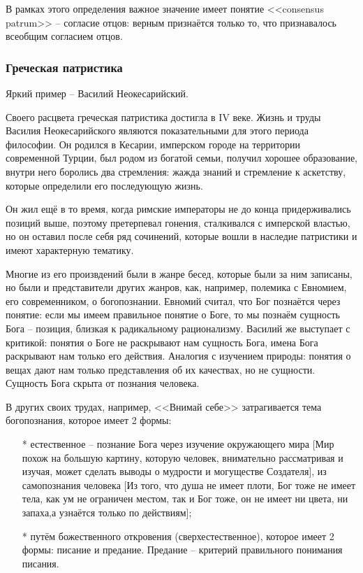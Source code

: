 \documentclass[a4paper, 12pt]{book} %
\begin{document}
В рамках этого определения важное значение имеет понятие <<consensus patrum>> -- согласие отцов: верным признаётся только то, что признавалось всеобщим согласием отцов.

\subsubsection{Греческая патристика}
Яркий пример -- Василий Неокесарийский.

Своего расцвета греческая патристика достигла в IV веке. Жизнь и труды Василия Неокесарийского являются показательными для этого периода философии. Он родился в Кесарии, имперском городе на территории современной Турции, был родом из богатой семьи, получил хорошее образование, внутри него боролись два стремления: жажда знаний и стремление к аскетству, которые определили его последующую жизнь.

Он жил ещё в то время, когда римские императоры не до конца придерживались позиций выше, поэтому претерпевал гонения, сталкивался с имперской властью, но он оставил после себя ряд сочинений, которые вошли в наследие патристики и имеют характерную тематику. 

Многие из его произвдений были в жанре бесед, которые были за ним записаны, но были и представители других жанров, как, например, полемика с Евномием, его современником, о богопознании. Евномий считал, что Бог познаётся через понятие: если мы имеем правильное понятие о Боге, то мы познаём сущность Бога -- позиция, близкая к радикальному рационализму. Василий же выступает с критикой: понятия о Боге не раскрывают нам сущность Бога, имена Бога раскрывают нам только его действия. Аналогия с изучением природы: понятия о вещах дают нам только представления об их качествах, но не сущности. Сущность Бога скрыта от познания человека. 

В других своих трудах, например, <<Внимай себе>> затрагивается тема богопознания, которое имеет 2 формы:
\begin{itemize}
\item[*] естественное -- познание Бога через изучение окружающего мира [Мир похож на большую картину, которую человек, внимательно рассматривая и изучая, может сделать выводы о мудрости и могуществе Создателя], из самопознания человека [Из того, что душа не имеет плоти, Бог тоже не имеет тела, как ум не ограничен местом, так и Бог тоже, он не имеет ни цвета, ни запаха,а узнаётся только по действиям]; 
\item[*] путём божественного откровения (сверхестественное), которое имеет 2 формы: писание и предание. Предание -- критерий правильного понимания писания.
\end{itemize}
\end{document}
